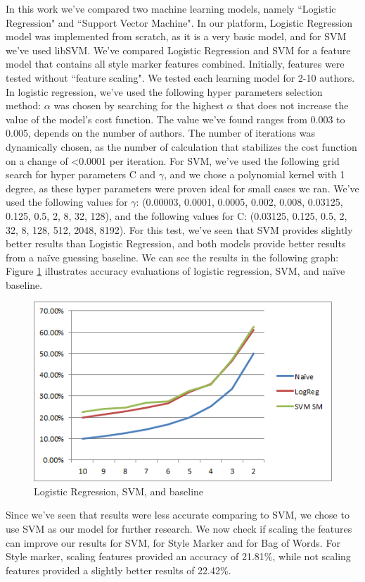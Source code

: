 \documentclass[a4paper]{article}
\begin{document}
In this work we've compared two machine learning models, namely ``Logistic Regression" and ``Support Vector Machine".
In our platform, Logistic Regression model was implemented from scratch, as it is a very basic model, and for SVM we've used libSVM\citep{chang}.
We've compared Logistic Regression and SVM for a feature model that contains all style marker features combined.
Initially, features were tested without ``feature scaling".
We tested each learning model for 2-10 authors.
In logistic regression, we've used the following hyper parameters selection method:
$\alpha$ was chosen by searching for the highest $\alpha$ that does not increase the value of the model's cost function. The value we've found ranges from 0.003 to 0.005, depends on the number of authors.
The number of iterations was dynamically chosen, as the number of calculation that stabilizes the cost function on a change of \textless 0.0001 per iteration.
For SVM, we've used the following grid search for hyper parameters C and $\gamma$, and we chose a polynomial kernel with 1 degree, as these hyper parameters were proven ideal for small cases we ran.
We've used the following values for $\gamma$: (0.00003, 0.0001, 0.0005, 0.002, 0.008, 0.03125, 0.125, 0.5, 2, 8, 32, 128), and the following values for C: (0.03125, 0.125, 0.5, 2, 32, 8, 128, 512, 2048, 8192).
For this test, we've seen that SVM provides slightly better results than Logistic Regression, and both models provide better results from a na\"ive guessing baseline. We can see the results in the following graph:
Figure \ref{fig:LR vs. SVM} illustrates accuracy evaluations of logistic regression, SVM, and na\"ive baseline.
\begin{figure}[!h]
	\centering
	\includegraphics[width=.5\textwidth]{"figures/lrvssvm"}
	\caption{Logistic Regression, SVM, and baseline}
		\label{fig:LR vs. SVM}
\end{figure}
Since we've seen that results were less accurate comparing to SVM, we chose to use SVM as our model for further research.
We now check if scaling the features can improve our results for SVM, for Style Marker and for Bag of Words.
For Style marker, scaling features provided an accuracy of 21.81\%, while not scaling features provided a slightly better results of 22.42\%.
\end{document}

